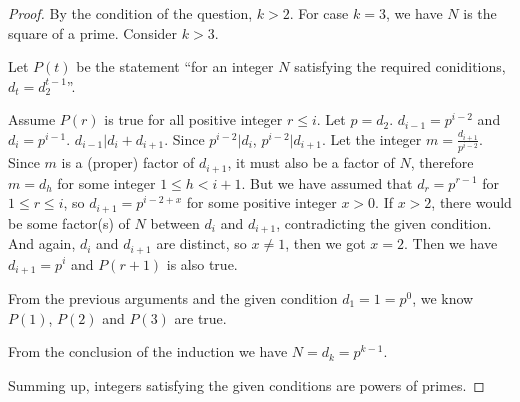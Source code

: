 \begin{proof}
\hspace{3em}

By the condition of the question, $k > 2$. For case $k = 3$, we have $N$ is the square of a prime. Consider $k > 3$.

\hspace{3em}

Let $P(t)$ be the statement ``for an integer $N$ satisfying the required coniditions, $d_t = d_2^{t-1}$''. 

\hspace{3em}

Assume $P(r)$ is true for all positive integer $r \le i$. Let $p = d_2$. $d_{i-1} = p^{i-2}$ and $d_i = p^{i-1}$. $d_{i-1} | d_i + d_{i+1}$. Since $p^{i-2} | d_i$, $p^{i-2} | d_{i+1}$. Let the integer $m = \frac{d_{i+1}}{p^{i-2}}$. Since $m$ is a (proper) factor of $d_{i+1}$, it must also be a factor of $N$, therefore $m = d_h$ for some integer $1 \le h < i+1$. But we have assumed that $d_r = p^{r-1}$ for $1 \le r \le i$, so $d_{i+1} = p^{i-2+x}$ for some positive integer $x > 0$. If $x > 2$, there would be some factor(s) of $N$ between $d_i$ and $d_{i+1}$, contradicting the given condition. And again, $d_i$ and $d_{i+1}$ are distinct, so $x \ne 1$, then we got $x = 2$. Then we have $d_{i+1} = p^i$ and $P(r+1)$ is also true.

\hspace{3em}

From the previous arguments and the given condition $d_1 = 1 = p^0$, we know $P(1)$, $P(2)$ and $P(3)$ are true. 

\hspace{3em}

From the conclusion of the induction we have $ N = d_k = p^{k-1} $.

\hspace{3em}

Summing up, integers satisfying the given conditions are powers of primes.

\end{proof}
